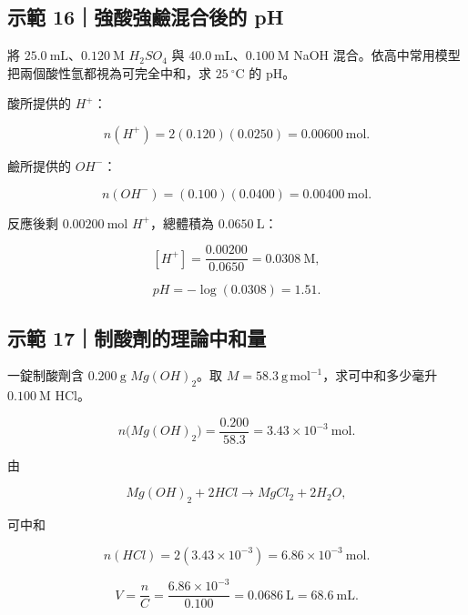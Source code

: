 \documentclass[11pt,a4paper]{article}
\begin{document}
\begin{HandoutWorkedExample}

\subsection{示範 16｜強酸強鹼混合後的 pH}\label{ux793aux7bc4-16ux5f37ux9178ux5f37ux9e7cux6df7ux5408ux5f8cux7684-ph}

將 \(25.0\ \mathrm{mL}\)、\(0.120\ \mathrm M\) \(H_2SO_4\) 與 \(40.0\ \mathrm{mL}\)、\(0.100\ \mathrm M\) NaOH 混合。依高中常用模型把兩個酸性氫都視為可完全中和，求 \(25\ ^\circ\mathrm C\) 的 pH。

酸所提供的 \(H^+\)：

\[
n(H^+)=2(0.120)(0.0250)=0.00600\ \mathrm{mol}.
\]

鹼所提供的 \(OH^-\)：

\[
n(OH^-)=(0.100)(0.0400)=0.00400\ \mathrm{mol}.
\]

反應後剩 \(0.00200\ \mathrm{mol}\) \(H^+\)，總體積為 \(0.0650\ \mathrm L\)：

\[
[H^+]=\frac{0.00200}{0.0650}=0.0308\ \mathrm M,
\]

\[
pH=-\log(0.0308)=1.51.
\]

\end{HandoutWorkedExample}

\begin{HandoutWorkedExample}

\subsection{示範 17｜制酸劑的理論中和量}\label{ux793aux7bc4-17ux5236ux9178ux5291ux7684ux7406ux8ad6ux4e2dux548cux91cf}

一錠制酸劑含 \(0.200\ \mathrm g\) \(Mg(OH)_2\)。取 \(M=58.3\ \mathrm{g\,mol^{-1}}\)，求可中和多少毫升 \(0.100\ \mathrm M\) HCl。

\[
n\bigl(Mg(OH)_2\bigr)=\frac{0.200}{58.3}=3.43\times10^{-3}\ \mathrm{mol}.
\]

由

\[
Mg(OH)_2+2HCl\rightarrow MgCl_2+2H_2O,
\]

可中和

\[
n(HCl)=2(3.43\times10^{-3})=6.86\times10^{-3}\ \mathrm{mol}.
\]

\[
V=\frac{n}{C}=\frac{6.86\times10^{-3}}{0.100}
=0.0686\ \mathrm L=68.6\ \mathrm{mL}.
\]

\end{HandoutWorkedExample}
\end{document}
